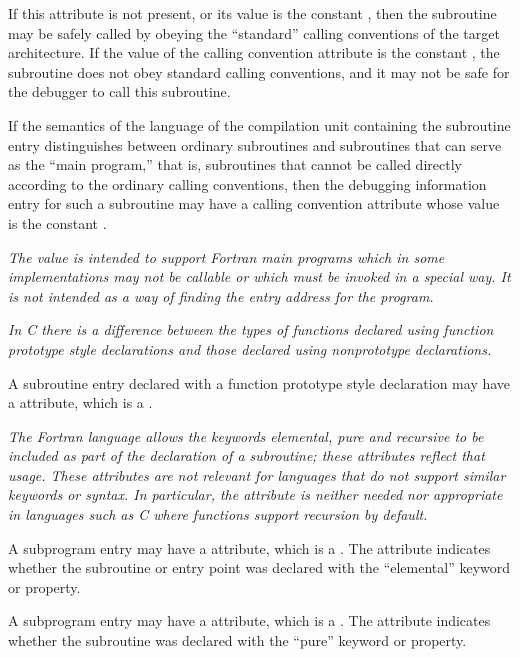 If this attribute is not present, or its value is the constant
, then the subroutine may be safely called by
obeying the ``standard'' calling conventions of the target
architecture. If the value of the calling convention attribute
is the constant , the subroutine does not obey
standard calling conventions, and it may not be safe for the
debugger to call this subroutine.

If the semantics of the language of the compilation unit
containing the subroutine entry distinguishes between ordinary
subroutines and subroutines that can serve as the ``main
program,'' that is, subroutines that cannot be called
directly according to the ordinary calling conventions,
then the debugging information entry for such a subroutine
may have a calling convention attribute whose value is the
constant .

\textit{The  value is intended to support Fortran main
programs which in some implementations may not be callable
or which must be invoked in a special way. It is not intended
as a way of finding the entry address for the program.
}

\textit{In C there is a difference between the types of functions
declared using function prototype style declarations and
those declared using non\dash prototype declarations.
}

A subroutine entry declared with a function prototype style
declaration may have a 
 attribute, which is
a .

\textit{The Fortran language allows the keywords elemental, pure
and recursive to be included as part of the declaration of
a subroutine; these attributes reflect that usage. These
attributes are not relevant for languages that do not support
similar keywords or syntax. In particular, the 
attribute is neither needed nor appropriate in languages such
as C where functions support recursion by default.
}

A subprogram entry may have a  attribute, which
is a . 
The attribute indicates whether the subroutine
or entry point was declared with the ``elemental'' keyword
or property.

A subprogram entry may have a  attribute, which is
a . 
The attribute indicates whether the subroutine was
declared with the ``pure'' keyword or property.

